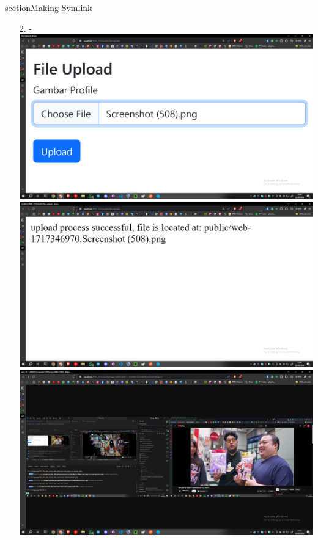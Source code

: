 \documentclass[12pt,titlepage]{article}
\begin{document}
section{Making Symlink}
\begin{enumerate}
    \item[2.] - \\ \includegraphics[width=.9\textwidth]{images/figures/Screenshot (509).png} \\ \includegraphics[width=.9\textwidth]{images/figures/Screenshot (510).png} \\ \includegraphics[width=.9\textwidth]{images/figures/Screenshot (511).png}

\end{enumerate}
\end{document}
